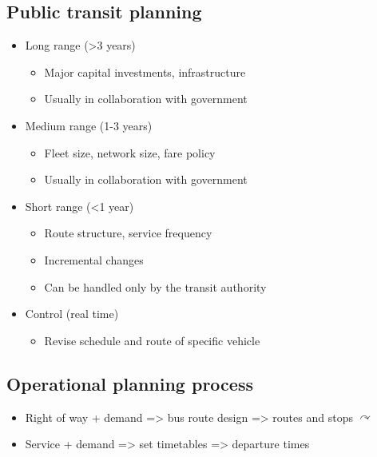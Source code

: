\documentclass[11pt]{article}
\begin{document}
\subsection{Public transit planning}
\label{sec:org37bdfee}
\begin{itemize}
\item Long range (>3 years)
\begin{itemize}
\item Major capital investments, infrastructure
\item Usually in collaboration with government
\end{itemize}
\item Medium range (1-3 years)
\begin{itemize}
\item Fleet size, network size, fare policy
\item Usually in collaboration with government
\end{itemize}
\item Short range (<1 year)
\begin{itemize}
\item Route structure, service frequency
\item Incremental changes
\item Can be handled only by the transit authority
\end{itemize}
\item Control (real time)
\begin{itemize}
\item Revise schedule and route of specific vehicle
\end{itemize}
\end{itemize}

\subsection{Operational planning process}
\label{sec:org62209f7}
\begin{itemize}
\item Right of way + demand => bus route design => routes and stops \(\curvearrowright\)
\item Service + demand => set timetables => departure times
\end{itemize}
\end{document}
